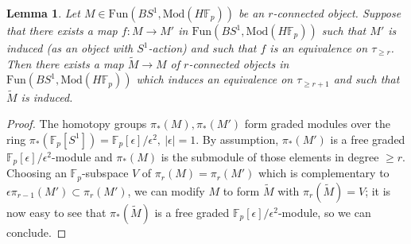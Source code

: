 \documentclass{amsart}
\renewcommand{\mod}{\mathrm{Mod}}
\newtheorem{lemma}[theorem]{Lemma}
\theoremstyle{definition}
\newcommand{\fun}{\mathrm{Fun}}
\begin{document}
\begin{lemma} 
\label{S1fplemma}
Let $M \in \fun(BS^1, \mod(H\mathbb{F}_p))$ be an $r$-connected 
object. Suppose that there exists a map $f\colon M \to M'$ in 
$\fun(BS^1, \mod(H\mathbb{F}_p))$ such that $M'$ is induced (as an object with
$S^1$-action) and such that 
$f$ is an equivalence on $\tau_{\geq r}$. 
Then there exists a map $\widetilde{M} \to M$ of $r$-connected objects in
$\fun(BS^1, \mod(H \mathbb{F}_p))$ which induces an equivalence on $\tau_{\geq
r+1}$ and such that $\widetilde{M}$ is induced. 
\end{lemma} 
\begin{proof} 
The homotopy groups $\pi_*(M), \pi_*(M')$ form graded modules over the ring
$\pi_*( \mathbb{F}_p[S^1]) = \mathbb{F}_p[\epsilon]/\epsilon^2, \ |\epsilon| = 1$. 
By assumption, $\pi_*(M')$ is a free graded
$\mathbb{F}_p[\epsilon]/\epsilon^2$-module and $\pi_*(M)$ is the submodule of
those elements in degree $\geq r$. 
Choosing an $\mathbb{F}_p$-subspace $V$ of $\pi_r(M) = \pi_r(M')$ which is complementary to
$\epsilon \pi_{r-1}(M') \subset \pi_r(M')$, we can modify $M$ to form
$\widetilde{M}$ with $\pi_r(\widetilde{M}) = V$; it is now easy to see that
$\pi_*(\widetilde{M})$ is a free graded
$\mathbb{F}_p[\epsilon]/\epsilon^2$-module, so we can conclude.
\end{proof} 
\end{document}
